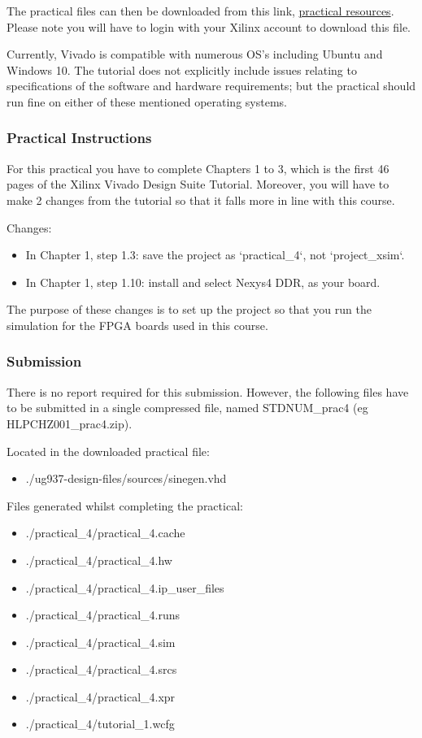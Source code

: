 The practical files can then be downloaded from this link, \href{https://www.xilinx.com/member/forms/download/design-license.html?cid=16f763e2-d450-4d78-ad1a-a68479efa5ac&filename=ug937-design-files.zip}{practical resources}. Please note you will have to login with your Xilinx account to download this file.

Currently, Vivado is compatible with numerous OS’s including Ubuntu and Windows 10. The tutorial does not explicitly include issues relating to specifications of the software and hardware requirements; but the practical should run fine on either of these mentioned operating systems. 

\subsubsection{Practical Instructions}
For this practical you have to complete Chapters 1 to 3, which is the first 46 pages of the Xilinx Vivado Design Suite Tutorial. Moreover, you will have to make 2 changes from the tutorial so that it falls more in line with this course.

Changes:
\begin{itemize}
    \item In Chapter 1, step 1.3: save the project as `practical\_4`, not `project\_xsim`.
    \item In Chapter 1, step 1.10: install and select Nexys4 DDR, as your board.
\end{itemize}

The purpose of these changes is to set up the project so that you run the simulation for the FPGA boards used in this course.

\subsubsection{Submission}
There is no report required for this submission. However, the following files have to be submitted in a single compressed file, named STDNUM\_prac4 (eg HLPCHZ001\_prac4.zip). 

Located in the downloaded practical file: 
\begin{itemize}
    \item ./ug937-design-files/sources/sinegen.vhd
\end{itemize}
 

Files generated whilst completing the practical:
\begin{itemize}
    \item ./practical\_4/practical\_4.cache
    \item ./practical\_4/practical\_4.hw
    \item ./practical\_4/practical\_4.ip\_user\_files
    \item ./practical\_4/practical\_4.runs
    \item ./practical\_4/practical\_4.sim
    \item ./practical\_4/practical\_4.srcs
    \item ./practical\_4/practical\_4.xpr
    \item ./practical\_4/tutorial\_1.wcfg
\end{itemize}

